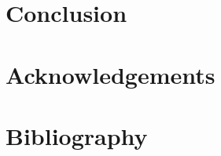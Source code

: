 \documentclass[12pt]{article}
\begin{document}
\section{Conclusion}


\section{Acknowledgements}


%

\section{Bibliography}
 

\end{document}
